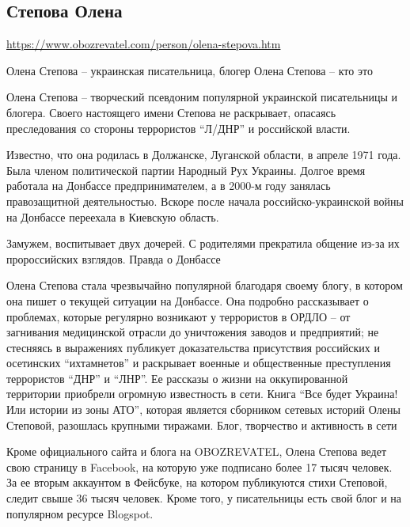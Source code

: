  
 
 
 
 

\subsection{Степова Олена}
\label{sec:auth.stepova_olena}

\url{https://www.obozrevatel.com/person/olena-stepova.htm}

Олена Степова – украинская писательница, блогер
Олена Степова – кто это

Олена Степова – творческий псевдоним популярной украинской писательницы и блогера. Своего настоящего имени Степова не раскрывает, опасаясь преследования со стороны террористов “Л/ДНР” и российской власти.

Известно, что она родилась в Должанске, Луганской области, в апреле 1971 года. Была членом политической партии Народный Рух Украины. Долгое время работала на Донбассе предпринимателем, а в 2000-м году занялась правозащитной деятельностью. Вскоре после начала российско-украинской войны на Донбассе переехала в Киевскую область.

Замужем, воспитывает двух дочерей. С родителями прекратила общение из-за их пророссийских взглядов.
Правда о Донбассе

Олена Степова стала чрезвычайно популярной благодаря своему блогу, в котором она пишет о текущей ситуации на Донбассе. Она подробно рассказывает о проблемах, которые регулярно возникают у террористов в ОРДЛО – от загнивания медицинской отрасли до уничтожения заводов и предприятий; не стесняясь в выражениях публикует доказательства присутствия российских и осетинских “ихтамнетов” и раскрывает военные и общественные преступления террористов “ДНР” и “ЛНР”. Ее рассказы о жизни на оккупированной территории приобрели огромную известность в сети. Книга “Все будет Украина! Или истории из зоны АТО”, которая является сборником сетевых историй Олены Степовой, разошлась крупными тиражами.
Блог, творчество и активность в сети

Кроме официального сайта и блога на OBOZREVATEL, Олена Степова ведет свою страницу в Facebook, на которую уже подписано более 17 тысяч человек. За ее вторым аккаунтом в Фейсбуке, на котором публикуются стихи Степовой, следит свыше 36 тысяч человек. Кроме того, у писательницы есть свой блог и на популярном ресурсе Blogspot.

